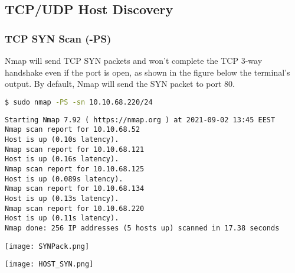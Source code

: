 \documentclass[11pt]{article}
\newenvironment{commandbox}[1][]{
  \begin{tcolorbox}[
      colback=kalibackground,
      colframe=commandcolor,
      fonttitle=\bfseries\color{white},
      title=#1,
      breakable=true
    ]
  }{
  \end{tcolorbox}
}
\begin{document}
\setcounter{section}{2}
\setcounter{subsection}{2}
\setcounter{page}{10}  %

\renewcommand{\thesubsubsection}{\thesubsection.\Roman{subsubsection}}

\subsection{TCP/UDP Host Discovery}

\subsubsection{TCP SYN Scan (-PS)}

Nmap will send TCP SYN packets and won't complete the TCP 3-way
handshake even if the port is open, as shown in the figure below the
terminal's output. By default, Nmap will send the SYN packet to port 80.

\begin{commandbox}[TCP SYN Scan (-PS)]
\begin{lstlisting}[language=bash, style=bash, basicstyle=\small\ttfamily\color{warningcolor}]
$ sudo nmap -PS -sn 10.10.68.220/24
\end{lstlisting}

\begin{lstlisting}[basicstyle=\small\ttfamily\color{kalitext}]
Starting Nmap 7.92 ( https://nmap.org ) at 2021-09-02 13:45 EEST
Nmap scan report for 10.10.68.52
Host is up (0.10s latency).
Nmap scan report for 10.10.68.121
Host is up (0.16s latency).
Nmap scan report for 10.10.68.125
Host is up (0.089s latency).
Nmap scan report for 10.10.68.134
Host is up (0.13s latency).
Nmap scan report for 10.10.68.220
Host is up (0.11s latency).
Nmap done: 256 IP addresses (5 hosts up) scanned in 17.38 seconds
\end{lstlisting}
\end{commandbox}

\begin{center}
  \texttt{[image: SYNPack.png]}
\end{center}
\begin{center}
  \texttt{[image: HOST\_SYN.png]}
\end{center}
\end{document}
